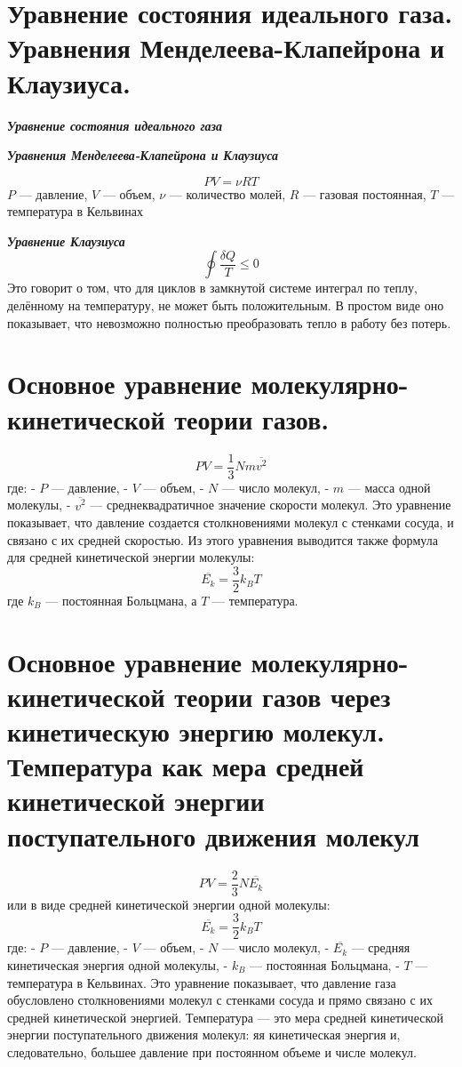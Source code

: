 \documentclass[14pt]{article}
\begin{document}
    \section{Уравнение состояния идеального газа. Уравнения Менделеева-Клапейрона и Клаузиуса.}
    \textbf{\textit{Уравнение состояния идеального газа}}
    \begin{center}
        \big[$PV=\nu RT$\big]
    \end{center}
    \textbf{\textit{Уравнения Менделеева-Клапейрона и Клаузиуса}}
    \begin{center}
        \[ PV = \nu RT \] \(P\) — давление, \(V\) — объем, \(\nu\) — количество молей, \(R\) — газовая постоянная, \(T\) — температура в Кельвинах
    \end{center}
    \textbf{\textit{Уравнение Клаузиуса}}
       \[ \oint \frac{\delta Q}{T} \leq 0 \] Это говорит о том, что для циклов в замкнутой системе интеграл по теплу, делённому на температуру, не может быть положительным. В простом виде оно показывает, что невозможно полностью преобразовать тепло в работу без потерь.

    \section{Основное уравнение молекулярно-кинетической теории газов.}
    \[ PV = \frac{1}{3} N m \overline{v^2} \] где: - \(P\) — давление, - \(V\) — объем, - \(N\) — число молекул, - \(m\) — масса одной молекулы, - \(\overline{v^2}\) — среднеквадратичное значение скорости молекул. 
    \newline Это уравнение показывает, что давление создается столкновениями молекул с стенками сосуда, и связано с их средней скоростью. Из этого уравнения выводится также формула для средней кинетической энергии молекулы: \[ \overline{E_k} = \frac{3}{2} k_B T \] где \(k_B\) — постоянная Больцмана, а \(T\) — температура.
    
    \section{Основное уравнение молекулярно-кинетической теории газов через кинетическую энергию молекул. Температура как мера средней кинетической энергии поступательного движения молекул}
    \[ PV = \frac{2}{3} N \overline{E_k} \] или в виде средней кинетической энергии одной молекулы: \[ \overline{E_k} = \frac{3}{2} k_B T \] 
    \newline где: - \(P\) — давление, - \(V\) — объем, - \(N\) — число молекул, - \(\overline{E_k}\) — средняя кинетическая энергия одной молекулы, - \(k_B\) — постоянная Больцмана, - \(T\) — температура в Кельвинах.
    \newline Это уравнение показывает, что давление газа обусловлено столкновениями молекул с стенками сосуда и прямо связано с их средней кинетической энергией. Температура — это мера средней кинетической энергии поступательного движения молекул: яя кинетическая энергия и, следовательно, большее давление при постоянном объеме и числе молекул.
\end{document}
